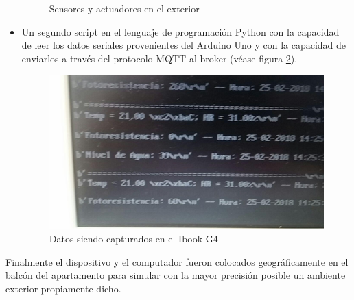 \begin{itemize}
\begin{figure}[htb]
\caption{Sensores y actuadores en el exterior}
\label{fig:sensores_ext}
\vspace*{-10pt}
\end{figure}

\item Un segundo script en el lenguaje de programación Python con la capacidad de leer los datos seriales provenientes del Arduino Uno y con la capacidad de enviarlos a través del protocolo MQTT al broker (véase figura \ref{fig:ibook_data}).
\begin{figure}[htb]
\centering
\includegraphics[scale=0.3]{./Figuras/ibook_data.jpg}
\caption{Datos siendo capturados en el Ibook G4}
\label{fig:ibook_data}
\vspace*{-10pt}
\end{figure}

\end{itemize}
Finalmente el dispositivo y el computador fueron colocados geográficamente en el balcón del apartamento para simular con la mayor precisión posible un ambiente exterior propiamente dicho.\\

